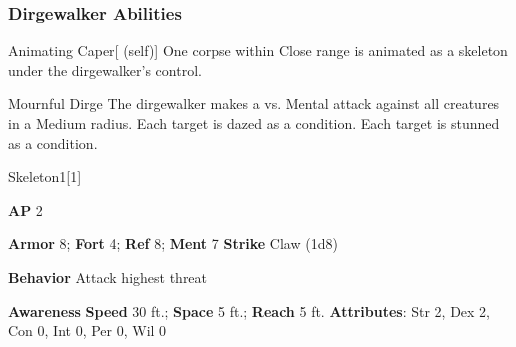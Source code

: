 \subsubsection{Dirgewalker Abilities}

\begin{ability}{Animating Caper}[ (self)]
One corpse within Close range is animated as a skeleton under the dirgewalker's control.
\end{ability}

\vspace{0.5em}
\begin{ability}{Mournful Dirge}
The dirgewalker makes a  vs. Mental attack against all creatures in a Medium radius.
\hit Each target is dazed as a condition.
\crit Each target is stunned as a condition.
\end{ability}

\begin{monsection}{Skeleton}{1}[1]
\vspace{-1em}\vspace{-1em}
\begin{spellcontent}
\begin{spelltargetinginfo}
{\textbf{AP} 2}

\pari \textbf{Armor} 8;
\textbf{Fort} 4;
\textbf{Ref} 8;
\textbf{Ment} 7
\pari \textbf{Strike} Claw  (1d8)



\pari \textbf{Behavior} Attack highest threat
\end{spelltargetinginfo}
\end{spellcontent}

\begin{monsterfooter}
\pari \textbf{Awareness} 
\pari \textbf{Speed} 30 ft.;
\textbf{Space} 5 ft.;
\textbf{Reach} 5 ft.
\pari \textbf{Attributes}:
Str 2,
Dex 2,
Con 0,
Int 0,
Per 0,
Wil 0
\end{monsterfooter}
\end{monsection}

